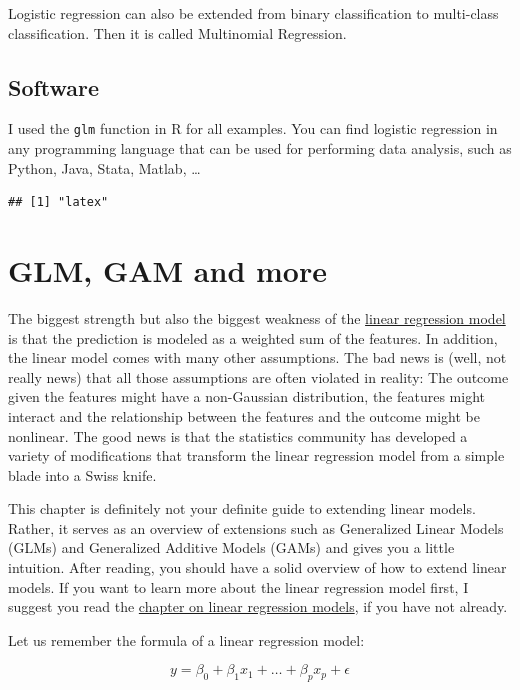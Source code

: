 \documentclass[
  11pt,
]{scrbook}
\begin{document}
Logistic regression can also be extended from binary classification to multi-class classification.
Then it is called Multinomial Regression.

\hypertarget{software}{%
\subsection{Software}\label{software}}

I used the \texttt{glm} function in R for all examples.
You can find logistic regression in any programming language that can be used for performing data analysis, such as Python, Java, Stata, Matlab, \ldots{}

\begin{verbatim}
## [1] "latex"
\end{verbatim}

\newpage

\hypertarget{extend-lm}{%
\section{GLM, GAM and more}\label{extend-lm}}

The biggest strength but also the biggest weakness of the \protect\hyperlink{limo}{linear regression model} is that the prediction is modeled as a weighted sum of the features.
In addition, the linear model comes with many other assumptions.
The bad news is (well, not really news) that all those assumptions are often violated in reality:
The outcome given the features might have a non-Gaussian distribution, the features might interact and the relationship between the features and the outcome might be nonlinear.
The good news is that the statistics community has developed a variety of modifications that transform the linear regression model from a simple blade into a Swiss knife.

This chapter is definitely not your definite guide to extending linear models.
Rather, it serves as an overview of extensions such as Generalized Linear Models (GLMs) and Generalized Additive Models (GAMs) and gives you a little intuition.
After reading, you should have a solid overview of how to extend linear models.
If you want to learn more about the linear regression model first, I suggest you read the \protect\hyperlink{limo}{chapter on linear regression models}, if you have not already.

Let us remember the formula of a linear regression model:

\[y=\beta_{0}+\beta_{1}x_{1}+\ldots+\beta_{p}x_{p}+\epsilon\]
\end{document}
